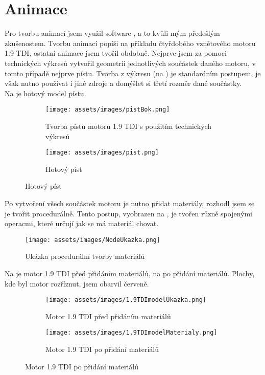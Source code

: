 \section{Animace}\label{sc:animace}
{Pro tvorbu animací jsem využil software , a to kvůli mým předešlým zkušenostem. Tvorbu animací popíši na příkladu čtyřdobého vznětového motoru 1.9 TDI, ostatní animace jsem tvořil obdobně.}\odst
{Nejprve jsem za pomoci technických výkresů vytvořil geometrii jednotlivých součástek daného motoru, v tomto případě nejprve pístu. Tvorba z výkresu (na ) je standardním postupem, je však nutno používat i jiné zdroje a domýšlet si třetí rozměr dané součástky.\\ Na  je hotový model pístu.}

\begin{figure}[H]
    \centering
    \begin{subfigure}{.5\textwidth}
        \centering
        \texttt{[image: assets/images/pistBok.png]}
        \caption{Tvorba pístu motoru 1.9 TDI s použitím technických výkresů \jaObr}
        \label{obr:pistVykresy}
    \end{subfigure}%
    \begin{subfigure}{.5\textwidth}
        \centering
        \texttt{[image: assets/images/pist.png]}
        \caption{Hotový píst \jaObr}
        \label{obr:pistHotovy}
    \end{subfigure}
\end{figure}

{Po vytvoření všech součástek motoru je nutno přidat materiály, rozhodl jsem se je tvořit procedurálně. Tento postup, vyobrazen na , je tvořen různě spojenými operacmi, které určují jak se má materiál chovat.}

\begin{figure}[H]
    \centering
    \texttt{[image: assets/images/NodeUkazka.png]}
    \caption{Ukázka procedurální tvorby materiálů \jaObr}
    \label{obr:NodeUkazka}
\end{figure}

\newpage

{Na  je motor 1.9 TDI před přidáním materiálů, na  po přidání materiálů. Plochy, kde byl motor rozříznut, jsem obarvil červeně.}

\begin{figure}[H]
    \centering
    \begin{subfigure}[t]{.45\textwidth}
        \centering
        \texttt{[image: assets/images/1.9TDImodelUkazka.png]}
        \caption{Motor 1.9 TDI před přidáním materiálů \jaObr}
        \label{obr:predMaterialy}
    \end{subfigure}
    \hfill
    \begin{subfigure}[t]{.45\textwidth}
        \centering
        \texttt{[image: assets/images/1.9TDImodelMaterialy.png]}
        \caption{Motor 1.9 TDI po přidání materiálů \jaObr}
        \label{obr:poMaterialy}
    \end{subfigure}
\end{figure}

